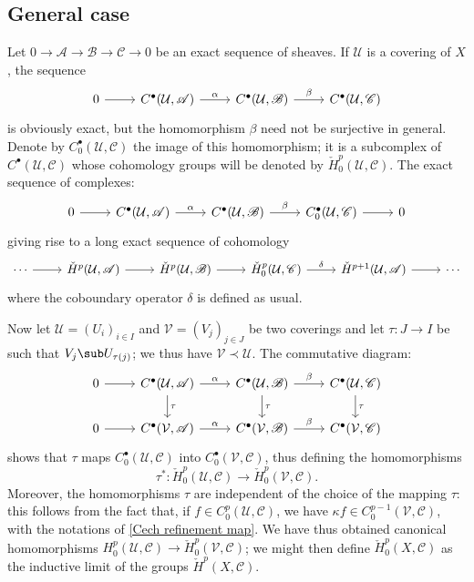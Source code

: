 \subsection{General case}
Let $0\to\mathscr{A}\to\mathscr{B}\to\mathscr{C}\to 0$ be an exact sequence of sheaves. If $\mathcal{U}$ is a covering of $X$, the sequence
\[\begin{tikzcd}
0\ar[r]&C^\bullet(\mathcal{U},\mathscr{A})\ar[r,"\alpha"]&C^\bullet(\mathcal{U},\mathscr{B})\ar[r,"\beta"]&C^\bullet(\mathcal{U},\mathscr{C})
\end{tikzcd}\]
is obviously exact, but the homomorphism $\beta$ need not be surjective in general. Denote by $C_0^\bullet(\mathcal{U},\mathscr{C})$ the image of this homomorphism; it is a subcomplex of $C^\bullet(\mathcal{U},\mathscr{C})$ whose cohomology groups will be denoted by $\check{H}^p_0(\mathcal{U},\mathscr{C})$. The exact sequence of complexes:
\[\begin{tikzcd}
0\ar[r]&C^\bullet(\mathcal{U},\mathscr{A})\ar[r,"\alpha"]&C^\bullet(\mathcal{U},\mathscr{B})\ar[r,"\beta"]&C_0^\bullet(\mathcal{U},\mathscr{C})\ar[r]&0
\end{tikzcd}\]
giving rise to a long exact sequence of cohomology
\[\begin{tikzcd}
\cdots\ar[r]&\check{H}^p(\mathcal{U},\mathscr{A})\ar[r]&\check{H}^p(\mathcal{U},\mathscr{B})\ar[r]&\check{H}^p_0(\mathcal{U},\mathscr{C})\ar[r,"\delta"]&\check{H}^{p+1}(\mathcal{U},\mathscr{A})\ar[r]&\cdots
\end{tikzcd}\]
where the coboundary operator $\delta$ is defined as usual.\par 
Now let $\mathcal{U}=(U_i)_{i\in I}$ and $\mathcal{V}=(V_j)_{j\in J}$ be two coverings and let $\tau:J\to I$ be such that $V_j\sub U_{\tau(j)}$; we thus have $\mathcal{V}\prec\mathcal{U}$. The commutative diagram:
\[\begin{tikzcd}
0\ar[r]&C^\bullet(\mathcal{U},\mathscr{A})\ar[r,"\alpha"]\ar[d,"\tau"]&C^\bullet(\mathcal{U},\mathscr{B})\ar[r,"\beta"]\ar[d,"\tau"]&C^\bullet(\mathcal{U},\mathscr{C})\ar[d,"\tau"]\\
0\ar[r]&C^\bullet(\mathcal{V},\mathscr{A})\ar[r,"\alpha"]&C^\bullet(\mathcal{V},\mathscr{B})\ar[r,"\beta"]&C^\bullet(\mathcal{V},\mathscr{C})
\end{tikzcd}\]
shows that $\tau$ maps $C_0^\bullet(\mathcal{U},\mathscr{C})$ into $C_0^\bullet(\mathcal{V},\mathscr{C})$, thus defining the homomorphisms
\[\tau^*:\check{H}^p_0(\mathcal{U},\mathscr{C})\to\check{H}^p_0(\mathcal{V},\mathscr{C}).\]
Moreover, the homomorphisms $\tau$ are independent of the choice of the mapping $\tau$: this follows from the fact that, if $f\in C^p_0(\mathcal{U},\mathscr{C})$, we have $\kappa f\in C^{p-1}_0(\mathcal{V},\mathscr{C})$, with the notations of \cref{Cech refinement map}. We have thus obtained canonical homomorphisms $H^p_0(\mathcal{U},\mathscr{C})\to\check{H}^p_0(\mathcal{V},\mathscr{C})$; we might then define $\check{H}^p_0(X,\mathscr{C})$ as the inductive limit of the groups $\check{H}^p(X,\mathscr{C})$.\par
